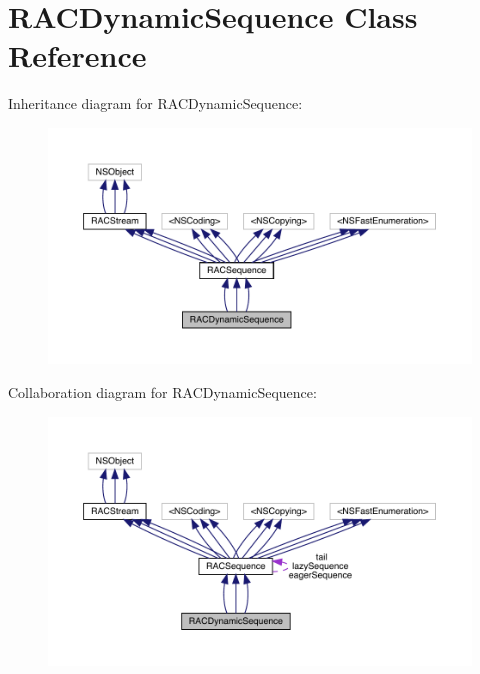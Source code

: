 \hypertarget{interface_r_a_c_dynamic_sequence}{}\section{R\+A\+C\+Dynamic\+Sequence Class Reference}
\label{interface_r_a_c_dynamic_sequence}


Inheritance diagram for R\+A\+C\+Dynamic\+Sequence\+:\nopagebreak
\begin{figure}[H]
\begin{center}
\leavevmode
\includegraphics[width=350pt]{interface_r_a_c_dynamic_sequence__inherit__graph}
\end{center}
\end{figure}


Collaboration diagram for R\+A\+C\+Dynamic\+Sequence\+:\nopagebreak
\begin{figure}[H]
\begin{center}
\leavevmode
\includegraphics[width=350pt]{interface_r_a_c_dynamic_sequence__coll__graph}
\end{center}
\end{figure}
